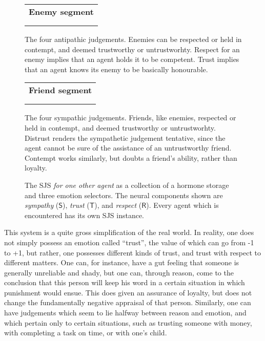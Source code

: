 \begin{figure}
	\centering
	\begin{tabular}{c}
	\textbf{\Large Enemy segment}\\
	\\
	\\
	\end{tabular}
	
	\caption{The four antipathic judgements. Enemies can be respected or held in contempt, and deemed trustworthy or untrustworhty. Respect for an enemy implies that an agent holds it to be competent. Trust implies that an agent knows its enemy to be basically honourable.}
	\label{fig:SJS_enemy}
\end{figure}

\begin{figure}
	\centering
	\begin{tabular}{c}
	\textbf{\Large Friend segment}\\
	\\
	\\
	\end{tabular}
	
	\caption{The four sympathic judgements. Friends, like enemies, respected or held in contempt, and deemed trustworthy or untrustworhty. Distrust renders the sympathetic judgement tentative, since the agent cannot be sure of the assistance of an untrustworthy friend. Contempt works similarly, but doubts a friend's ability, rather than loyalty.}
	\label{fig:SJS_friend}
\end{figure}

\begin{figure}
	\centering
	
	\caption{The SJS {\em for one other agent} as a collection of a hormone storage and three emotion selectors. The neural components shown are {\em sympathy} ($\mathsf{S}$), {\em trust} ($\mathsf{T}$), and {\em respect} ($\mathsf{R}$). Every agent which is encountered has its own SJS instance.}
	\label{fig:SJS_system}
\end{figure}

This system is a quite gross simplification of the real world. In reality, one does not simply possess an emotion called ``trust'', the value of which can go from -1 to +1, but rather, one possesses different kinds of trust, and trust with respect to different matters. One can, for instance, have a gut feeling that someone is generally unreliable and shady, but one can, through reason, come to the conclusion that this person will keep his word in a certain situation in which punishment would ensue. This does given an assurance of loyalty, but does not change the fundamentally negative appraisal of that person. Similarly, one can have judgements which seem to lie halfway between reason and emotion, and which pertain only to certain situations, such as trusting someone with money, with completing a task on time, or with one's child.

